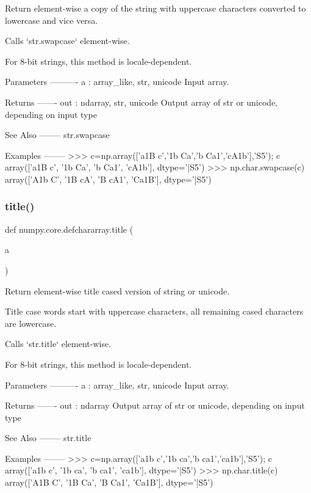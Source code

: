\begin{DoxyVerb}Return element-wise a copy of the string with
uppercase characters converted to lowercase and vice versa.

Calls `str.swapcase` element-wise.

For 8-bit strings, this method is locale-dependent.

Parameters
----------
a : array_like, {str, unicode}
    Input array.

Returns
-------
out : ndarray, {str, unicode}
    Output array of str or unicode, depending on input type

See Also
--------
str.swapcase

Examples
--------
>>> c=np.array(['a1B c','1b Ca','b Ca1','cA1b'],'S5'); c
array(['a1B c', '1b Ca', 'b Ca1', 'cA1b'],
    dtype='|S5')
>>> np.char.swapcase(c)
array(['A1b C', '1B cA', 'B cA1', 'Ca1B'],
    dtype='|S5')\end{DoxyVerb}
 \mbox{\label{namespacenumpy_1_1core_1_1defchararray_a8709b46f8e613f43e2827ffa2745b6fc}} 
\subsubsection{\texorpdfstring{title()}{title()}}
{\footnotesize\ttfamily def numpy.\+core.\+defchararray.\+title (\begin{DoxyParamCaption}\item[{}]{a }\end{DoxyParamCaption})}

\begin{DoxyVerb}Return element-wise title cased version of string or unicode.

Title case words start with uppercase characters, all remaining cased
characters are lowercase.

Calls `str.title` element-wise.

For 8-bit strings, this method is locale-dependent.

Parameters
----------
a : array_like, {str, unicode}
    Input array.

Returns
-------
out : ndarray
    Output array of str or unicode, depending on input type

See Also
--------
str.title

Examples
--------
>>> c=np.array(['a1b c','1b ca','b ca1','ca1b'],'S5'); c
array(['a1b c', '1b ca', 'b ca1', 'ca1b'],
    dtype='|S5')
>>> np.char.title(c)
array(['A1B C', '1B Ca', 'B Ca1', 'Ca1B'],
    dtype='|S5')\end{DoxyVerb}
 \mbox{\label{namespacenumpy_1_1core_1_1defchararray_ac68b62aa07c4bbb98e1d968ce2d97514}} 
